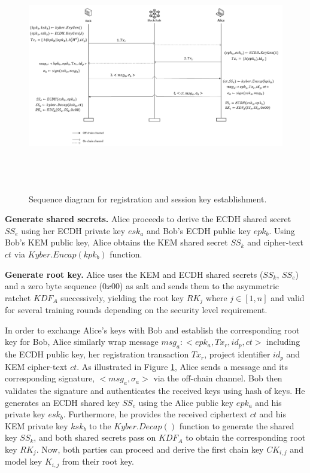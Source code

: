 \documentclass[a4paper,fleqn]{cas-dc}
\begin{document}
\begin{figure}[ht]
    \centering
\includegraphics[width=6.2in,height=4in]{Images/3.png}
    \caption{Sequence diagram for registration and session key establishment.}
    \label{fig:sequence diagram key establishment}
\end{figure}

\noindent\textbf{Generate shared secrets.} 
Alice proceeds to derive the ECDH shared secret $SS_{e}$ using her ECDH private key $esk_{a}$ and Bob's ECDH public key $epk_{b}$. 
Using Bob's KEM public key, Alice obtains the KEM shared secret $SS_{k}$ and cipher-text $ct$ via $Kyber.Encap\left ( kpk_{b} \right )$ function.

\noindent\textbf{Generate root key.} 
Alice uses the KEM and ECDH shared secrets ($SS_{k}$, $SS_{e}$) and a zero byte sequence ($0x00$) as salt and sends them to the asymmetric ratchet $KDF_{A}$ successively, yielding the root key $RK_{j}$ where $j\in [1,n]$ and valid for several training rounds depending on the security level requirement. 

In order to exchange Alice's keys with Bob and establish the corresponding root key for Bob, Alice similarly wrap message $msg_{a}:<epk_{a},Tx_{r},id_{p},ct>$ including the ECDH public key, her registration transaction $Tx_{r}$, project identifier $id_{p}$ and KEM cipher-text $ct$. 
As illustrated in Figure \ref{fig:sequence diagram key establishment}, Alice sends a message and its corresponding signature, $< msg_{a},\sigma_{a}>$ via the off-chain channel. 
Bob then validates the signature and authenticates the received keys using hash of keys. 
He generates an ECDH shared key $SS_{e}$ using the Alice public key $epk_{a}$ and his private key $esk_{b}$.
Furthermore, he provides the received ciphertext $ct$ and his KEM private key $ksk_{b}$ to the $Kyber.Decap()$ function to generate the shared key $SS_{k}$, and both shared secrets pass on $KDF_{A}$ to obtain the corresponding root key $RK_{j}$. 
Now, both parties can proceed and derive the first chain key $CK_{i,j}$ and model key $K_{i,j}$ from their root key.
\end{document}
